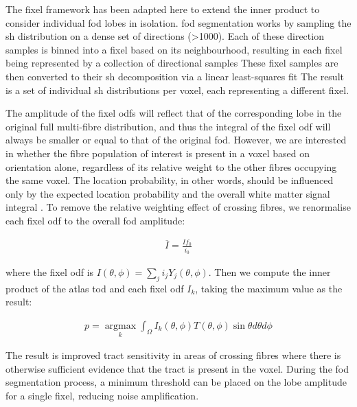 The fixel framework has been adapted here to extend the inner product to consider individual \gls{fod} lobes in isolation.
\gls{fod} segmentation works by sampling the \gls{sh} distribution on a dense set of directions (>1000).
Each of these direction samples is binned into a fixel based on its neighbourhood, resulting in each fixel being represented by a collection of directional samples 
These fixel samples are then converted to their \gls{sh} decomposition via a linear least-squares fit 
The result is a set of individual \gls{sh} distributions per voxel, each representing a different fixel.

The amplitude of the fixel \glspl{odf} will reflect that of the corresponding lobe in the original full multi-fibre distribution, and thus the integral of the fixel \gls{odf} will always be smaller or equal to that of the original \gls{fod}.
However, we are interested in whether the fibre population of interest is present in a voxel based on orientation alone, regardless of its relative weight to the other fibres occupying the same voxel.
The location probability, in other words, should be influenced only by the expected location probability  and the overall white matter signal integral .
To remove the relative weighting effect of crossing fibres, we renormalise each fixel \gls{odf} to the overall \gls{fod} amplitude:

\begin{align}
  \overline{I} = \frac{I f_0}{i_0}
\end{align}

where the fixel \gls{odf} is $I(\theta, \phi) = \sum_j i_j Y_j(\theta,\phi)$.
Then we compute the inner product of the atlas \gls{tod} and each fixel \gls{odf} $I_k$, taking the maximum value as the result:

\begin{align}
  p = \operatorname*{argmax}_k \int_\Omega I_k(\theta,\phi) T(\theta,\phi) \sin\theta d\theta d\phi
\end{align}

The result is improved tract sensitivity in areas of crossing fibres where there is otherwise sufficient evidence that the tract is present in the voxel.
During the \gls{fod} segmentation process, a minimum threshold can be placed on the lobe amplitude for a single fixel, reducing noise amplification.

